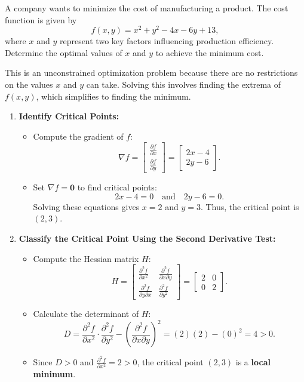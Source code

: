 \exampleline
\begin{example}
A company wants to minimize the cost of manufacturing a product. The cost function is given by 
\[
f(x, y) = x^2 + y^2 - 4x - 6y + 13,
\]
where \(x\) and \(y\) represent two key factors influencing production efficiency. Determine the optimal values of \(x\) and \(y\) to achieve the minimum cost.

\begin{solution}
This is an unconstrained optimization problem because there are no restrictions on the values \(x\) and \(y\) can take. Solving this involves finding the extrema of \(f(x, y)\), which simplifies to finding the minimum.

\begin{enumerate}
    \item \textbf{Identify Critical Points:}
    \begin{itemize}
        \item Compute the gradient of \(f\):
        \[
        \nabla f = \begin{bmatrix} \frac{\partial f}{\partial x} \\ \frac{\partial f}{\partial y} \end{bmatrix} = \begin{bmatrix} 2x - 4 \\ 2y - 6 \end{bmatrix}.
        \]
        \item Set \( \nabla f = \mathbf{0} \) to find critical points:
        \[
        2x - 4 = 0 \quad \text{and} \quad 2y - 6 = 0.
        \]
        Solving these equations gives \( x = 2 \) and \( y = 3 \). Thus, the critical point is \( (2, 3) \).
    \end{itemize}

    \item \textbf{Classify the Critical Point Using the Second Derivative Test:}
    \begin{itemize}
        \item Compute the Hessian matrix \(H\):
        \[
        H = \begin{bmatrix} 
        \frac{\partial^2 f}{\partial x^2} & \frac{\partial^2 f}{\partial x \partial y} \\ 
        \frac{\partial^2 f}{\partial y \partial x} & \frac{\partial^2 f}{\partial y^2} 
        \end{bmatrix} = \begin{bmatrix} 
        2 & 0 \\ 
        0 & 2 
        \end{bmatrix}.
        \]
        \item Calculate the determinant of \(H\):
        \[
        D = \frac{\partial^2 f}{\partial x^2} \cdot \frac{\partial^2 f}{\partial y^2} - \left( \frac{\partial^2 f}{\partial x \partial y} \right)^2 = (2)(2) - (0)^2 = 4 > 0.
        \]
        \item Since \(D > 0\) and \( \frac{\partial^2 f}{\partial x^2} = 2 > 0 \), the critical point \( (2, 3) \) is a \textbf{local minimum}.
    \end{itemize}


\end{enumerate}
\end{solution}
\end{example}
